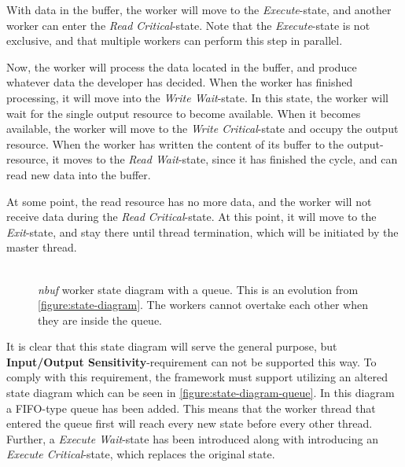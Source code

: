 \documentclass[a4paper]{article}
\newcommand{\nbuf}{\textit{nbuf} }
\begin{document}
With data in the buffer, the worker will move to the \textit{Execute}-state, and another worker can enter the \textit{Read Critical}-state. Note that the \textit{Execute}-state is not exclusive, and that multiple workers can perform this step in parallel. 

Now, the worker will process the data located in the buffer, and produce whatever data the developer has decided. When the worker has finished processing, it will move into the \textit{Write Wait}-state. In this state, the worker will wait for the single output resource to become available. When it becomes available, the worker will move to the \textit{Write Critical}-state and occupy the output resource. When the worker has written the content of its buffer to the output-resource, it moves to the \textit{Read Wait}-state, since it has finished the cycle, and can read new data into the buffer. 

At some point, the read resource has no more data, and the worker will not receive data during the \textit{Read Critical}-state. At this point, it will move to the \textit{Exit}-state, and stay there until thread termination, which will be initiated by the master thread.\\\\

\begin{figure}
	\begin{adjustwidth}{-0.5in}{-0.5in}
    \centering
    \def\svgwidth{\columnwidth}
    
  	\caption{\nbuf worker state diagram with a queue. This is an evolution from \autoref{figure:state-diagram}. The workers cannot overtake each other when they are inside the queue.}
	\label{figure:state-diagram-queue}
	\end{adjustwidth}
\end{figure}

It is clear that this state diagram will serve the general purpose, but \textbf{Input/Output Sensitivity}-requirement can not be supported this way. To comply with this requirement, the framework must support utilizing an altered state diagram which can be seen in \autoref{figure:state-diagram-queue}. In this diagram a FIFO-type queue has been added. This means that the worker thread that entered the queue first will reach every new state before every other thread. Further, a \textit{Execute Wait}-state has been introduced along with introducing an \textit{Execute Critical}-state, which replaces the original state.\\\\
\end{document}

